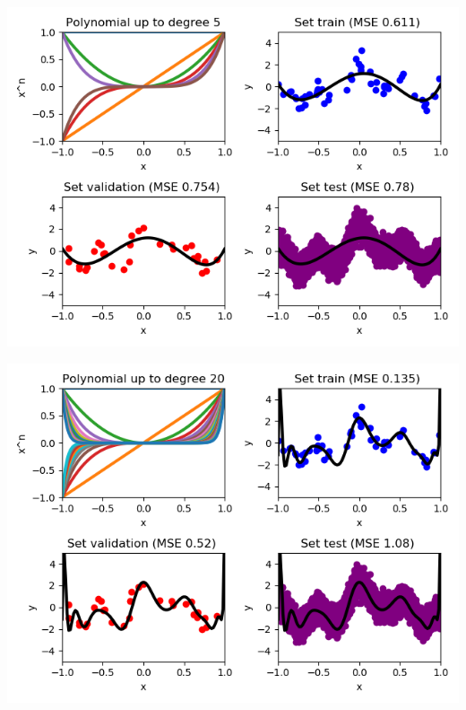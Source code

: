 \documentclass[a4paper]{article}
\begin{document}
\begin{itemize}
\begin{minipage}[b]{0.4\textwidth}
 \captionsetup{justification=centering}
  \label{plot_poly_degree2}
\end{minipage}
\begin{minipage}[b]{0.4\textwidth}
  \includegraphics[scale=0.35]{plots/plot_poly_degree5.png}
 \captionsetup{justification=centering}
  \label{plot_poly_degree5}
\end{minipage}
\hfill
\begin{minipage}[b]{0.4\textwidth}
  \includegraphics[scale=0.35]{plots/plot_poly_degree20.png}
 \captionsetup{justification=centering}
  \label{plot_poly_degree20}
\end{minipage}


\end{itemize}
\end{document}
